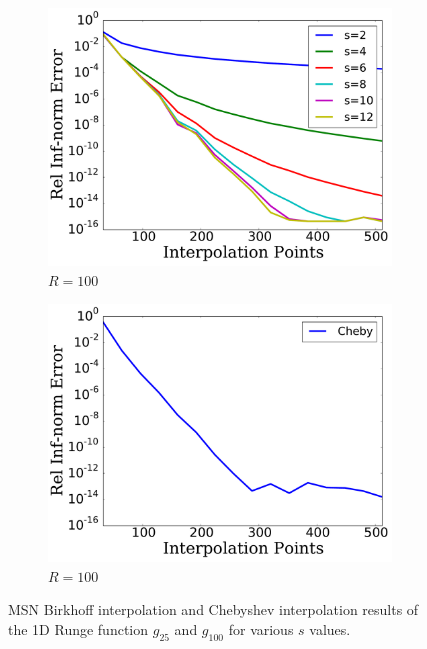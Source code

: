 \begin{figure}[p]
    \begin{subfigure}{0.45\textwidth}
    \includegraphics[width=\textwidth]{plots/msn_1d_birkhoff_smooth_R_100.pdf}
    \caption{$R=100$}
    \end{subfigure}
    \begin{subfigure}{0.45\textwidth}
    \includegraphics[width=\textwidth]{plots/cheby_1d_birkhoff_smooth_R_100.pdf}
    \caption{$R=100$}
    \end{subfigure}

\caption[Smooth Birkhoff Interpolation Comparison: 1D Runge Function]{
MSN Birkhoff interpolation and Chebyshev interpolation results
of the 1D Runge function $g_{25}$ and $g_{100}$ for various $s$ values.
}
\label{fig:smooth_comparison_1d_runge_birkhoff}
\end{figure}



